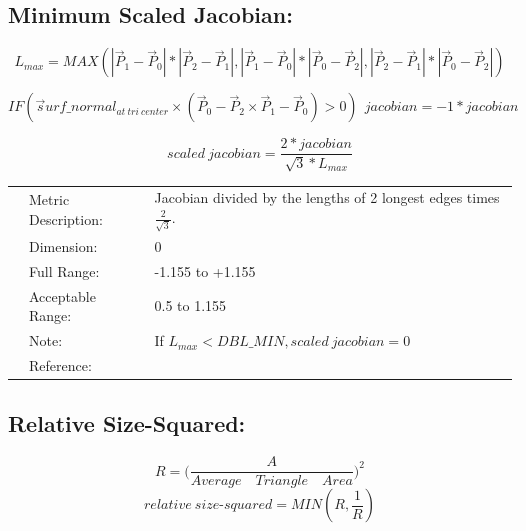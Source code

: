 \documentclass[12pt]{article}
\begin{document}
\subsection*{Minimum Scaled Jacobian:}

\begin{displaymath}
L_{max} = MAX( | \vec P_1 - \vec P_0 | * | \vec P_2 - \vec P_1 |, 
               | \vec P_1 - \vec P_0 | * | \vec P_0 - \vec P_2 |, 
               | \vec P_2 - \vec P_1 | * | \vec P_0 - \vec P_2 | )
\end{displaymath}

\begin{displaymath}
IF( \vec surf\_normal_{at~tri~center} \times ( \vec P_0 - \vec P_2 \times \vec P_1 - \vec P_0 ) > 0 )
~~jacobian = -1 * jacobian
\end{displaymath}

\begin{displaymath}
scaled~jacobian = \frac {2 * jacobian } { \sqrt 3 * L_{max} } 
\end{displaymath}

\begin{tabular}{lll}
& Metric Description:  & Jacobian divided by the lengths of 2 longest edges times $\frac{2}{\sqrt 3}$. \\
& Dimension:           & 0                                          \\ 
& Full Range:          & -1.155 to +1.155                           \\ 
& Acceptable Range:    & 0.5 to 1.155                               \\ 
& Note:                & If $L_{max} < DBL\_MIN, scaled~jacobian = 0$ \\
& Reference:           & \cite{four} \\
\end{tabular} 


\subsection*{Relative Size-Squared:}

\begin{displaymath}
R = \Bigg(\frac {A} {Average \quad Triangle \quad Area} \Bigg)^2
\end{displaymath}
\begin{displaymath}
relative~size \textrm{-}squared = MIN( R, \frac{1}{R} ) 
\end{displaymath}
\end{document}
